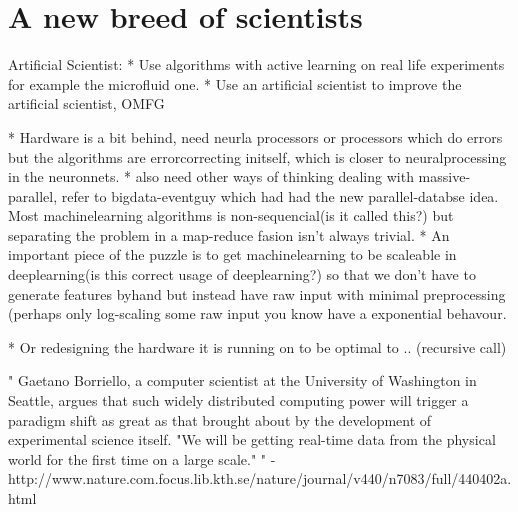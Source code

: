 \documentclass{article}
\begin{document}
\section{A new breed of scientists}
    Artificial Scientist: 
    * Use algorithms with active learning on real life experiments for example the
    microfluid one.
    * Use an artificial scientist to improve the artificial scientist, OMFG

    * Hardware is a bit  behind, need neurla processors or processors which do
    errors but the algorithms are errorcorrecting initself, which is closer to
    neuralprocessing in the neuronnets.
    * also need other ways of thinking dealing with massive-parallel, refer to
    bigdata-eventguy which had had the new parallel-databse idea. Most
    machinelearning algorithms is non-sequencial(is it called this?) but separating
    the problem in a map-reduce fasion isn't always trivial.
    * An important piece of the puzzle is to get machinelearning to be scaleable in
    deeplearning(is this correct usage of deeplearning?) so that we don't have to
    generate features byhand but instead have raw input with minimal preprocessing
    (perhaps only log-scaling some raw input you know have a exponential behavour.

    * Or redesigning the hardware it is running on to be optimal to .. (recursive
    call)


"
Gaetano Borriello, a computer scientist at the University of Washington in
Seattle, argues that such widely distributed computing power will trigger a
paradigm shift as great as that brought about by the development of
experimental science itself. "We will be getting real-time data from the
physical world for the first time on a large scale."
" - http://www.nature.com.focus.lib.kth.se/nature/journal/v440/n7083/full/440402a.html
\end{document}
